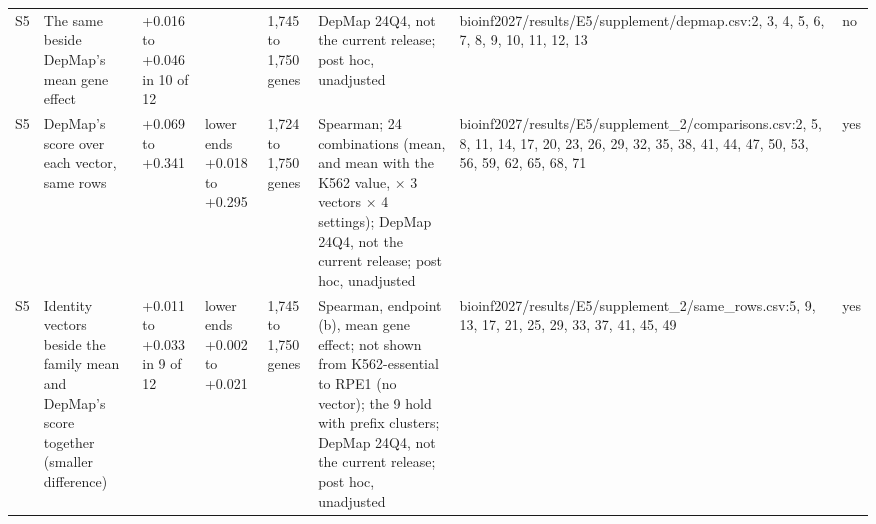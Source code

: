 \begin{tabular}{llllllll}
S5 & The same beside DepMap's mean gene effect & +0.016 to +0.046 in 10 of 12 &  & 1,745 to 1,750 genes & DepMap 24Q4, not the current release; post hoc, unadjusted & bioinf2027/results/E5/supplement/depmap.csv:2, 3, 4, 5, 6, 7, 8, 9, 10, 11, 12, 13 & no \\
S5 & DepMap's score over each vector, same rows & +0.069 to +0.341 & lower ends +0.018 to +0.295 & 1,724 to 1,750 genes & Spearman; 24 combinations (mean, and mean with the K562 value, × 3 vectors × 4 settings); DepMap 24Q4, not the current release; post hoc, unadjusted & bioinf2027/results/E5/supplement\_2/comparisons.csv:2, 5, 8, 11, 14, 17, 20, 23, 26, 29, 32, 35, 38, 41, 44, 47, 50, 53, 56, 59, 62, 65, 68, 71 & yes \\
S5 & Identity vectors beside the family mean and DepMap's score together (smaller difference) & +0.011 to +0.033 in 9 of 12 & lower ends +0.002 to +0.021 & 1,745 to 1,750 genes & Spearman, endpoint (b), mean gene effect; not shown from K562-essential to RPE1 (no vector); the 9 hold with prefix clusters; DepMap 24Q4, not the current release; post hoc, unadjusted & bioinf2027/results/E5/supplement\_2/same\_rows.csv:5, 9, 13, 17, 21, 25, 29, 33, 37, 41, 45, 49 & yes \\
\bottomrule
\end{tabular}
